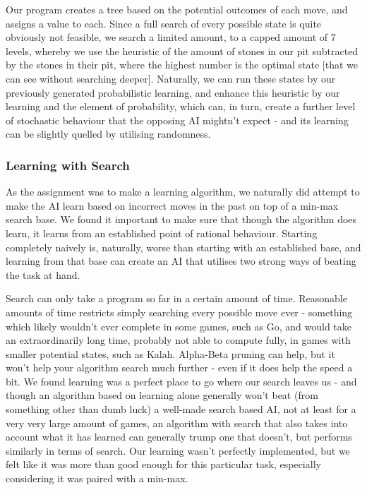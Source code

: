 \documentclass[11pt]{article}
\begin{document}
Our program creates a tree based on the potential outcomes of each move, and assigns a value to each. Since a full search of every possible state is quite obviously not feasible, we search a limited amount, to a capped amount of 7 levels, whereby we use the heuristic of the amount of stones in our pit subtracted by the stones in their pit, where the highest number is the optimal state [that we can see without searching deeper]. Naturally, we can run these states by our previously generated probabilistic learning, and enhance this heuristic by our learning and the element of probability, which can, in turn, create a further level of stochastic behaviour that the opposing AI mightn't expect - and its learning can be slightly quelled by utilising randomness.
\subsubsection{Learning with Search}
\label{sec-3-2-3}

As the assignment was to make a learning algorithm, we naturally did attempt to make the AI learn based on incorrect moves in the past on top of a min-max search base. We found it important to make sure that though the algorithm does learn, it learns from an established point of rational behaviour. Starting completely naively is, naturally, worse than starting with an established base, and learning from that base can create an AI that utilises two strong ways of beating the task at hand.

Search can only take a program so far in a certain amount of time. Reasonable amounts of time restricts simply searching every possible move ever - something which likely wouldn't ever complete in some games, such as Go, and would take an extraordinarily long time, probably not able to compute fully, in games with smaller potential states, such as Kalah. Alpha-Beta pruning can help, but it won't help your algorithm search much further - even if it does help the speed a bit. We found learning was a perfect place to go where our search leaves us - and though an algorithm based on learning alone generally won't beat (from something other than dumb luck) a well-made search based AI, not at least for a very very large amount of games, an algorithm with search that also takes into account what it has learned can generally trump one that doesn't, but performs similarly in terms of search. Our learning wasn't perfectly implemented, but we felt like it was more than good enough for this particular task, especially considering it was paired with a min-max.
\end{document}
